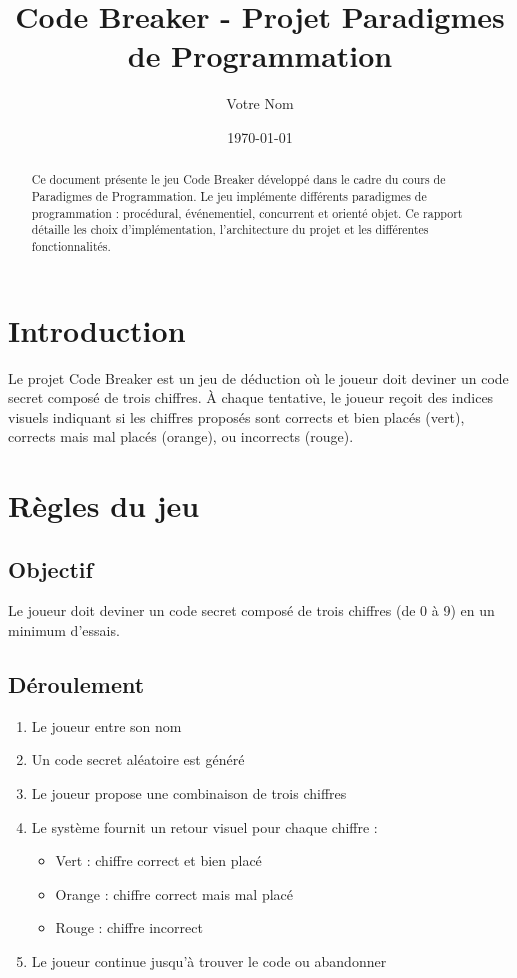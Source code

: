 \documentclass{article}
\title{Code Breaker - Projet Paradigmes de Programmation}
\author{Votre Nom}
\date{\today}
\begin{document}
\maketitle

\begin{abstract}
Ce document présente le jeu Code Breaker développé dans le cadre du cours de Paradigmes de Programmation. Le jeu implémente différents paradigmes de programmation : procédural, événementiel, concurrent et orienté objet. Ce rapport détaille les choix d'implémentation, l'architecture du projet et les différentes fonctionnalités.
\end{abstract}

\tableofcontents

\newpage

\section{Introduction}

Le projet Code Breaker est un jeu de déduction où le joueur doit deviner un code secret composé de trois chiffres. À chaque tentative, le joueur reçoit des indices visuels indiquant si les chiffres proposés sont corrects et bien placés (vert), corrects mais mal placés (orange), ou incorrects (rouge).



\section{Règles du jeu}

\subsection{Objectif}
Le joueur doit deviner un code secret composé de trois chiffres (de 0 à 9) en un minimum d'essais.

\subsection{Déroulement}
\begin{enumerate}
    \item Le joueur entre son nom
    \item Un code secret aléatoire est généré
    \item Le joueur propose une combinaison de trois chiffres
    \item Le système fournit un retour visuel pour chaque chiffre :
    \begin{itemize}
        \item Vert : chiffre correct et bien placé
        \item Orange : chiffre correct mais mal placé
        \item Rouge : chiffre incorrect
    \end{itemize}
    \item Le joueur continue jusqu'à trouver le code ou abandonner
\end{enumerate}
\end{document}
